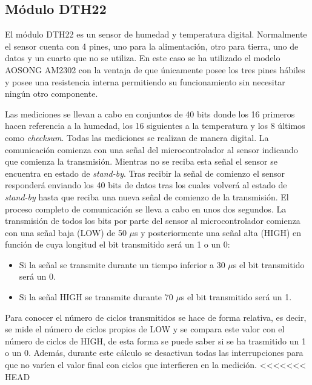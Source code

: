 \subsection{M\'odulo DTH22}\label{subsec:dht22}

El m\'odulo DTH22 es un sensor de humedad y temperatura
digital. Normalmente el sensor cuenta con 4 pines, uno para la
alimentaci\'on, otro para tierra, uno de datos y un cuarto que no se
utiliza. En este caso se ha utilizado el modelo AOSONG AM2302 con la
ventaja de que \'unicamente posee los tres pines h\'abiles y posee una
resistencia interna permitiendo su funcionamiento sin necesitar
ning\'un otro componente.

Las mediciones se llevan a cabo en conjuntos de 40 bits donde los 16
primeros hacen referencia a la humedad, los 16 siguientes a la
temperatura y los 8 \'ultimos como \emph{checksum}. Todas las mediciones se
realizan de manera digital. La comunicaci\'on comienza con una se\~nal
del microcontrolador al sensor indicando que comienza la
transmisi\'on. Mientras no se reciba esta se\~nal el sensor se encuentra
en estado de \emph{stand-by}. Tras recibir la se\~nal de comienzo el sensor
responder\'a enviando los 40 bits de datos tras los cuales volver\'a
al estado de \emph{stand-by} hasta que reciba una nueva se\~nal de comienzo de
la transmisi\'on. El proceso completo de comunicaci\'on se lleva a
cabo en unos dos segundos. La transmisi\'on de todos los bits por
parte del sensor al microcontrolador comienza con una se\~nal baja (LOW)
de 50 $\mu$s y posteriormente una se\~nal alta (HIGH) en funci\'on de
cuya longitud el bit transmitido ser\'a un 1 o un 0:
\begin{itemize}
\item Si la se\~nal se transmite durante un tiempo inferior a 30 $\mu$s
  el bit transmitido ser\'a un 0.

\item Si la se\~nal HIGH se transmite durante 70 $\mu$s el bit
  transmitido ser\'a un 1.

\end{itemize}

Para conocer el n\'umero de ciclos transmitidos se hace de forma relativa, es decir,
se mide el n\'umero de ciclos propios de LOW y se compara este valor con
el n\'umero de ciclos de HIGH, de esta forma se puede saber si se ha trasmitido
un 1 o un 0. Adem\'as, durante este c\'alculo se desactivan todas las interrupciones
para que no var\'ien el valor final con ciclos que interfieren en la medici\'on.
<<<<<<< HEAD

